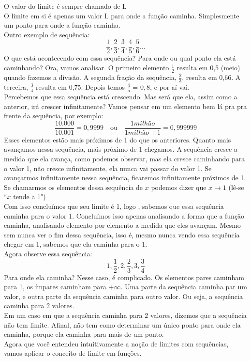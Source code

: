 \documentclass{article}
\begin{document}
O valor do limite é sempre chamado de L
\\[2pt]
O limite em si é apenas um valor L para onde a função caminha. Simplesmente um ponto para onde a função caminha.
\\[2pt]
Outro exemplo de sequência:
\[
\frac{1}{2}, \frac{2}{3}, \frac{3}{4}, \frac{4}{5}, \frac{5}{6}...
\]
O que está acontecendo com essa sequência? Para onde ou qual ponto ela está caminhando? Ora, vamos analisar. O primeiro elemento ${\frac{1}{2}}$ resulta em 0,5 (meio) quando fazemos a divisão. A segunda fração da sequência, ${\frac{2}{3}}$, resulta em 0,66. A terceira, ${\frac{3}{4}}$ resulta em 0,75. Depois temos ${\frac{4}{5}}$ = ${0,8}$, e por aí vai.
\\[2pt]
Percebemos que essa sequência está crescendo. Mas será que ela, assim como a anterior, irá crescer infinitamente? Vamos pensar em um elemento bem lá pra pra frente da sequência, por exemplo:
\[
\frac{10.000}{10.001}=0,9999 \quad \text{ou} \quad \frac{1 milhão}{1milhão+1} = 0,999999
\]
Esses elementos estão mais próximos de 1 do que os anteriores. Quanto mais avançamos nessa sequência, mais próximo de 1 chegamos. A sequência cresce a medida que ela avança, como podemos observar, mas ela cresce caminhando para o valor 1, não cresce infinitamente, ela nunca vai passar do valor 1. Se avançarmos infinitamente nessa sequência, ficaremos infinitamente próximos de 1. Se chamarmos os elementos dessa sequência de $x$ podemos dizer que $x \to 1$ (lê-se ``$x$ tende a 1")
\\[2pt]
Com isso concluímos que seu limite é 1, logo , sabemos que essa sequência caminha para o valor 1. Concluímos isso apenas analisando a forma que a função caminha, analisando elemento por elemento a medida que eles avançam. Mesmo sem nunca ver o fim dessa sequência, isso é, mesmo nunca vendo essa sequência chegar em 1, sabemos que ela caminha para o 1.
\\[5pt]
Agora observe essa sequência:
\[
1, \frac{1}{2}, 2, \frac{2}{3}, 3, \frac{3}{4}
\]
Para onde ela caminha? Nesse caso, é complicado. Os elementos pares caminham para 1, os ímpares caminham para $+\infty$. Uma parte da sequência caminha par um valor, e outra parte da sequência caminha para outro valor. Ou seja, a sequência caminha para 2 valores.
\\[2pt]
Em um caso em que a sequência caminha para 2 valores, dizemos que a sequência não tem limite. Afinal, não tem como determinar um único ponto para onde ela caminha, porque ela caminha para mais de um ponto.
\\[2pt]
Agora que você entendeu intuitivamente a noção de limites com sequências, vamos aplicar o conceito de limite em funções.
\end{document}
